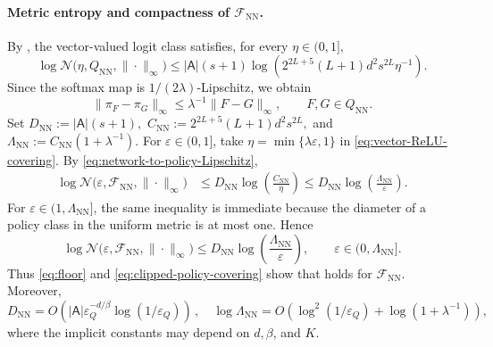 \documentclass{article}
\theoremstyle{definition}
\theoremstyle{remark}
\theoremstyle{plain}
\def\eqsp{\,}
\numberwithin{equation}{section}
\begin{document}
\paragraph{Metric entropy and compactness of \(\mathcal{F}_{\operatorname{NN}}\).}
By \cite[Lemma~5]{MR4134774}, the vector-valued logit class satisfies,
for every \(\eta\in(0,1]\),
\begin{equation}
\label{eq:vector-ReLU-covering}
    \log
    \mathcal N
    \bigl(
        \eta, Q_{\mathrm{NN}},\|\cdot\|_\infty
    \bigr)
    \leq
    |\mathsf A|(s+1)
    \log
    (
        {
            2^{2 L+5}(L+1)d^2 s^{2L}
        }{\eta^{-1}}
    ).
\end{equation}
Since the softmax map is \(1/(2\lambda)\)-Lipschitz, we obtain 
\begin{equation}
\label{eq:network-to-policy-Lipschitz}
    \|\pi_F-\pi_G\|_\infty
    \leq
    \lambda^{-1}
    \|F-G\|_\infty,
    \qquad
    F,G\in Q_{\mathrm{NN}}.
\end{equation}
Set
\(
    D_{\mathrm{NN}}
    :=
    |\mathsf A|(s+1),\)
\(C_{\mathrm{NN}}
    :=
    2^{2L+5}(L+1)d^2 s^{2L},
\)
and
\(
    \Lambda_{\mathrm{NN}}
    :=
    C_{\mathrm{NN}}
    \left(
        1+\lambda^{-1}
    \right).
\)
For \(\varepsilon\in(0,1]\), take
\(\eta=\min\{\lambda\varepsilon,1\}\) in
\eqref{eq:vector-ReLU-covering}. By
\eqref{eq:network-to-policy-Lipschitz},
\[
\begin{aligned}
    \log
    \mathcal N
    \bigl(
        \varepsilon,
        \mathcal F_{\mathrm{NN}},
        \|\cdot\|_\infty
    \bigr)
    &\leq
    D_{\mathrm{NN}}
    \log
    \left(
        \frac{C_{\mathrm{NN}}}{\eta}
    \right)
    \leq
    D_{\mathrm{NN}}
    \log
    \left(
        \frac{\Lambda_{\mathrm{NN}}}{\varepsilon}
    \right).
\end{aligned}
\]
For \(\varepsilon\in(1,\Lambda_{\mathrm{NN}}]\), the same inequality is
immediate because the diameter of a policy class in the uniform metric
is at most one. Hence
\begin{equation}
\label{eq:clipped-policy-covering}
    \log
    \mathcal N
    \bigl(
        \varepsilon,
        \mathcal F_{\mathrm{NN}},
        \|\cdot\|_\infty
    \bigr)
    \leq
    D_{\mathrm{NN}}
    \log
    \left(
        \frac{\Lambda_{\mathrm{NN}}}{\varepsilon}
    \right),
    \qquad
    \varepsilon\in(0,\Lambda_{\mathrm{NN}}].
\end{equation}
 Thus 
\eqref{eq:floor} and
\eqref{eq:clipped-policy-covering} show that
 holds for \(\mathcal F_{\mathrm{NN}}\).
Moreover,
\[
    D_{\mathrm{NN}}
    =
    O\left(
        |\mathsf A|
        \varepsilon_Q^{-d/\beta}
        \log(1/\varepsilon_Q)
    \right)\eqsp, \quad  \log\Lambda_{\mathrm{NN}}
    =
    O\left(
        \log^2(1/\varepsilon_Q)
        +
        \log(1+\lambda^{-1})
    \right),
\]
where the implicit constants may depend on \(d,\beta\), and \(K\).
\end{document}
